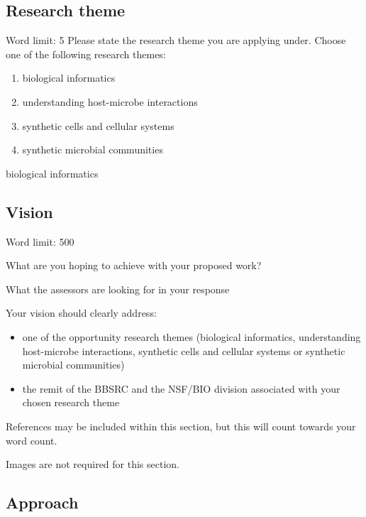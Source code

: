 \documentclass[12in]{article}
\begin{document}
\subsection{Research theme}

{\color{red}
Word limit: 5
Please state the research theme you are applying under. Choose one of the following research themes:

\begin{enumerate}
	\item biological informatics
	\item understanding host-microbe interactions
	\item synthetic cells and cellular systems
	\item synthetic microbial communities
\end{enumerate}
}

biological informatics

\pagebreak
\subsection{Vision}

{\color{red}
Word limit: 500

What are you hoping to achieve with your proposed work?

What the assessors are looking for in your response

Your vision should clearly address:

\begin{itemize}

	\item one of the opportunity research themes (biological informatics,
understanding host-microbe interactions, synthetic cells and cellular systems
or synthetic microbial communities)

	\item the remit of the BBSRC and the NSF/BIO division associated with your
chosen research theme

\end{itemize}

References may be included within this section, but this will count towards your
word count.

Images are not required for this section.
}



\pagebreak
\subsection{Approach}
\end{document}
